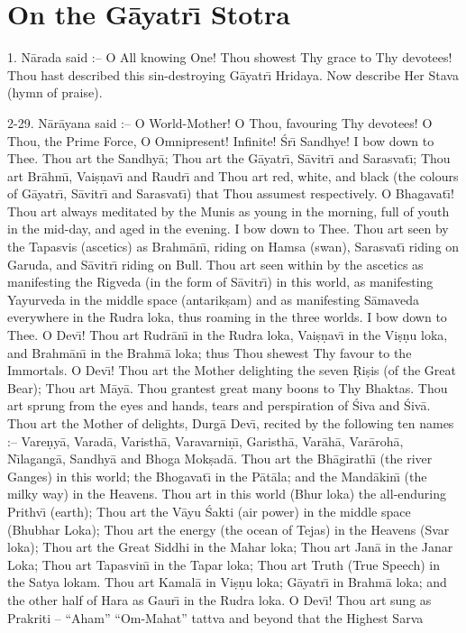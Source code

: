 \chapter{On the G\=ayatr\={\i} Stotra}

1. N\=arada said :-- O All knowing One! Thou showest Thy grace to Thy devotees! Thou hast described this sin-destroying G\=ayatr\={\i} Hridaya. Now describe Her Stava (hymn of praise).

2-29. N\=ar\=ayana said :-- O World-Mother! O Thou, favouring Thy devotees! O Thou, the Prime Force, O Omnipresent! Infinite! \'Sr\={\i} Sandhye! I bow down to Thee. Thou art the Sandhy\=a; Thou art the G\=ayatr\={\i}, S\=avitr\={\i} and Sarasvat\={\i}; Thou art Br\=ahm\={\i}, Vai\d{s}\d{n}av\={\i} and Raudr\={\i} and Thou art red, white, and black (the colours of G\=ayatr\={\i}, S\=avitr\={\i} and Sarasvat\={\i}) that Thou assumest respectively. O Bhagavat\={\i}! Thou art always meditated by the Munis as young in the morning, full of youth in the mid-day, and aged in the evening. I bow down to Thee. Thou art seen by the Tapasvis (ascetics) as Brahm\=an\={\i}, riding on Hamsa (swan), Sarasvat\={\i} riding on Garuda, and S\=avitr\={\i} riding on Bull. Thou art seen within by the ascetics as manifesting the Rigveda (in the form of S\=avitr\={\i}) in this world, as manifesting Yayurveda in the middle space (antarik\d{s}am) and as manifesting S\=amaveda everywhere in the Rudra loka, thus roaming in the three worlds. I bow down to Thee. O Dev\={\i}! Thou art Rudr\=an\={\i} in the Rudra loka, Vai\d{s}\d{n}av\={\i} in the Vi\d{s}\d{n}u loka, and Brahm\=an\={\i} in the Brahm\=a loka; thus Thou shewest Thy favour to the Immortals. O Dev\={\i}! Thou art the Mother delighting the seven \d{R}i\d{s}is (of the Great Bear); Thou art M\=ay\=a. Thou grantest great many boons to Thy Bhaktas. Thou art sprung from the eyes and hands, tears and perspiration of \'Siva and \'Siv\=a. Thou art the Mother of delights, Durg\=a Dev\={\i}, recited by the following ten names :-- Vare\d{n}y\=a, Varad\=a, Varisth\=a, Varavarni\d{n}\={\i}, Garisth\=a, Var\=ah\=a, Var\=aroh\=a, N\={\i}lagang\=a, Sandhy\=a and Bhoga Mok\d{s}ad\=a. Thou art the Bh\=agirath\={\i} (the river Ganges) in this world; the Bhogavat\={\i} in the P\=at\=ala; and the Mand\=akin\={\i} (the milky way) in the Heavens. Thou art in this world (Bhur loka) the all-enduring Prithv\={\i} (earth); Thou art the V\=ayu \'Sakti (air power) in the middle space (Bhubhar Loka); Thou art the energy (the ocean of Tejas) in the Heavens (Svar loka); Thou art the Great Siddhi in the Mahar loka; Thou art Jan\=a in the Janar Loka; Thou art Tapasvin\={\i} in the Tapar loka; Thou art Truth (True Speech) in the Satya lokam. Thou art Kamal\=a in Vi\d{s}\d{n}u loka; G\=ayatr\={\i} in Brahm\=a loka; and the other half of Hara as Gaur\={\i} in the Rudra loka. O Dev\={\i}! Thou art sung as Prakriti -- ``Aham'' ``Om-Mahat'' tattva and beyond that the Highest Sarva

